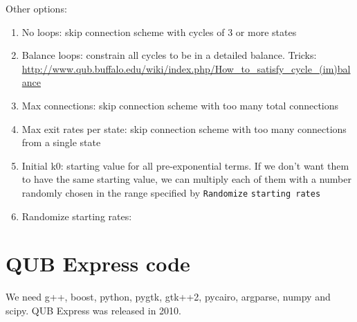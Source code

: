 Other options:
\begin{enumerate}
  \item No loops: skip connection scheme with cycles of 3 or more states
  \item Balance loops: constrain all cycles to be in a detailed balance. Tricks:
  \url{http://www.qub.buffalo.edu/wiki/index.php/How_to_satisfy_cycle_(im)balance}
  \item Max connections: skip connection scheme with too many total connections 
  \item Max exit rates per state: skip connection scheme with too many connections from a
  single state
  \item Initial k0: starting value for all pre-exponential terms. If we don't
  want them to have the same starting value, we can multiply each of them
  with a number randomly chosen in the range specified by \verb!Randomize!
  \verb!starting rates!
  \item Randomize starting rates: 
  
\end{enumerate}



\section{QUB Express code}

We need g++, boost, python, pygtk, gtk++2, pycairo, argparse, numpy and scipy.
QUB Express was released in 2010. 
